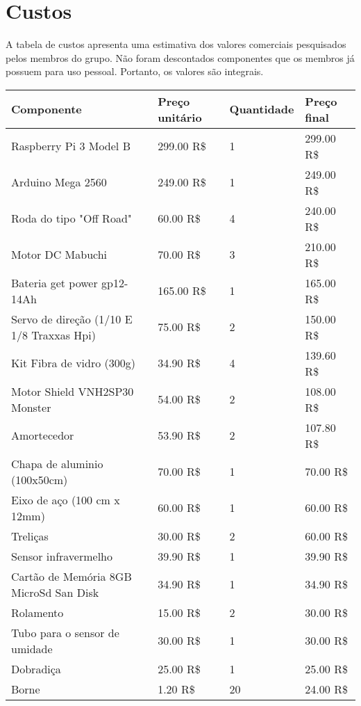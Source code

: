 \chapter{Custos}

A tabela de custos apresenta uma estimativa dos valores comerciais
pesquisados pelos membros do grupo. Não foram descontados componentes
que os membros já possuem para uso pessoal. Portanto, os valores
são integrais.

\begin{table}[!htbp]
\begin{center}
\begin{tabular}{|p{4cm}|p{4cm}|p{3cm}|p{4cm}|}
\hline
\textbf{Componente} & \textbf{Preço unitário} & \textbf{Quantidade} & \textbf{Preço final}\\\hline\hline
Raspberry Pi 3 Model B & 299.00 R\$ & 1 & 299.00 R\$\\\hline
Arduino Mega 2560 & 249.00 R\$ & 1 & 249.00 R\$\\\hline
Roda do tipo "Off Road" & 60.00 R\$ & 4 & 240.00 R\$\\\hline
Motor DC Mabuchi & 70.00 R\$ & 3 & 210.00 R\$\\\hline
Bateria get power gp12-14Ah & 165.00 R\$ & 1 & 165.00 R\$\\\hline
Servo de direção (1/10 E 1/8 Traxxas Hpi) & 75.00 R\$ & 2 & 150.00 R\$\\\hline
Kit Fibra de vidro (300g) & 34.90 R\$ & 4 & 139.60 R\$\\\hline
Motor Shield VNH2SP30 Monster & 54.00 R\$ & 2 & 108.00 R\$\\\hline
Amortecedor & 53.90 R\$ & 2 & 107.80 R\$\\\hline
Chapa de aluminio (100x50cm) & 70.00 R\$ & 1 & 70.00 R\$\\\hline
Eixo de aço (100 cm x 12mm) & 60.00 R\$ & 1 & 60.00 R\$\\\hline
Treliças & 30.00 R\$ & 2 & 60.00 R\$\\\hline
Sensor infravermelho & 39.90 R\$ & 1 & 39.90 R\$\\\hline
Cartão de Memória 8GB MicroSd San Disk  & 34.90 R\$ & 1 & 34.90 R\$\\\hline
Rolamento & 15.00 R\$ & 2 & 30.00 R\$\\\hline
Tubo para o sensor de umidade & 30.00 R\$ & 1 & 30.00 R\$\\\hline
Dobradiça & 25.00 R\$ & 1 & 25.00 R\$\\\hline
Borne & 1.20 R\$ & 20 & 24.00 R\$\\\hline

\end{tabular}
\end{center}
\end{table}
